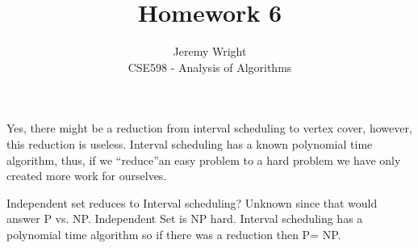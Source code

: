 \documentclass[12pt]{article}
\newenvironment{problem}[2][Problem]{\begin{trivlist}
\item[\hskip \labelsep {\bfseries #1}\hskip \labelsep {\bfseries #2.}]}{\end{trivlist}}
\begin{document}
 
 
\title{Homework 6}%
\author{Jeremy Wright\\ %
CSE598 - Analysis of Algorithms} %
 
\maketitle
\begin{problem}{8.1a}
    Yes, there might be a reduction from interval scheduling to vertex cover,
    however, this reduction is useless. Interval scheduling has a known
    polynomial time algorithm, thus, if we ``reduce''an easy problem to a hard
    problem we have only created more work for ourselves.
\end{problem}

\begin{problem}{8.1b}
    Independent set reduces to Interval scheduling? Unknown since that would
    answer P vs. NP.  Independent Set is NP hard. Interval scheduling has
    a polynomial time algorithm so if there was a reduction then P= NP.
\end{problem}
\end{document}
